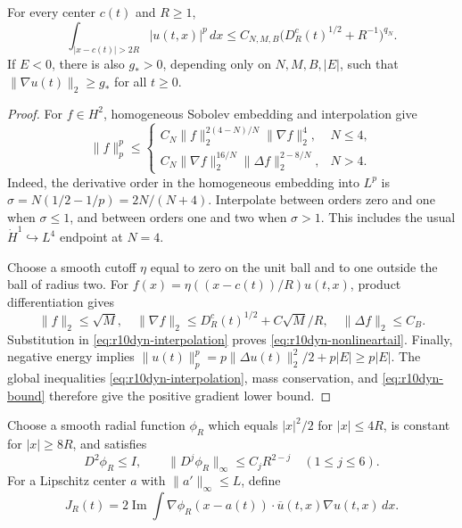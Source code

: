 \begin{lemma}
\label{lem:r10dyn-nonlinear}
For every center $c(t)$ and $R\ge1$,
\begin{equation}\label{eq:r10dyn-nonlineartail}
 \int_{|x-c(t)|>2R}|u(t,x)|^p\,dx
 \le C_{N,M,B}\bigl(D_R^c(t)^{1/2}+R^{-1}\bigr)^{q_N}.
\end{equation}
If $E<0$, there is also $g_*>0$, depending only on $N,M,B,|E|$,
such that $\|\nabla u(t)\|_2\ge g_*$ for all $t\ge0$.
\end{lemma}
\begin{proof}
For $f\in H^2$, homogeneous Sobolev embedding and interpolation give
\begin{equation}\label{eq:r10dyn-interpolation}
 \|f\|_p^p\le
 \begin{cases}
 C_N\|f\|_2^{2(4-N)/N}\|\nabla f\|_2^4,&N\le4,\\[2pt]
 C_N\|\nabla f\|_2^{16/N}\|\Delta f\|_2^{2-8/N},&N>4.
 \end{cases}
\end{equation}
Indeed, the derivative order in the homogeneous embedding into $L^p$ is
$\sigma=N(1/2-1/p)=2N/(N+4)$. Interpolate between orders zero and one
when $\sigma\le1$, and between orders one and two when $\sigma>1$.
This includes the usual $\dot H^1\hookrightarrow L^4$ endpoint at $N=4$.

Choose a smooth cutoff $\eta$ equal to zero on the unit ball and to one
outside the ball of radius two. For
$f(x)=\eta((x-c(t))/R)u(t,x)$, product differentiation gives
\[
 \|f\|_2\le\sqrt M,\quad
 \|\nabla f\|_2\le D_R^c(t)^{1/2}+C\sqrt M/R,\quad
 \|\Delta f\|_2\le C_B.
\]
Substitution in \eqref{eq:r10dyn-interpolation} proves
\eqref{eq:r10dyn-nonlineartail}. Finally, negative energy implies
$\|u(t)\|_p^p=p\|\Delta u(t)\|_2^2/2+p|E|\ge p|E|$.
The global inequalities \eqref{eq:r10dyn-interpolation}, mass conservation,
and \eqref{eq:r10dyn-bound} therefore give the positive gradient lower bound.
\end{proof}

Choose a smooth radial function $\phi_R$ which equals $|x|^2/2$ for
$|x|\le4R$, is constant for $|x|\ge8R$, and satisfies
\[
 D^2\phi_R\le I,\qquad
 \|D^j\phi_R\|_\infty\le C_jR^{2-j}\quad(1\le j\le6).
\]
For a Lipschitz center $a$ with $\|a'\|_\infty\le L$, define
\begin{equation}\label{eq:r10dyn-virialfunctional}
 J_R(t)=2\operatorname{Im}\int
 \nabla\phi_R(x-a(t))\cdot\overline u(t,x)\nabla u(t,x)\,dx.
\end{equation}

